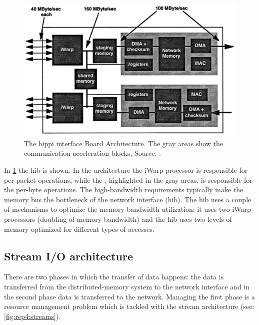 \begin{figure}
    \centering
	\includegraphics[width=0.95\linewidth]{Figures/Rep4hib.png}
	\caption{The \ac{hippi} interface Board Architecture. The gray areas show the communication acceleration blocks, Source: \cite{steenkiste1997high}.}
    \label{fig:rep4:hib}
\end{figure}

In \cref{fig:rep4:hib} the \ac{hib} is shown.
In the architecture the iWarp processor is responsible for per-packet operations, while the , highlighted in the gray areas, is responsible for the per-byte operations.
The high-bandwidth requirements typically make the memory bus the bottleneck of the network interface (\ac{hib}).
The \ac{hib} uses a couple of mechanisms to optimize the memory bandwidth utilization: it uses two iWarp processors (doubling of memory bandwidth) and the \ac{hib} uses two levels of memory optimized for different types of accesses.


\subsection{Stream I/O architecture}
There are two phases in which the transfer of data happens: the data is transferred from the distributed-memory system to the network interface and in the second phase data is transferred to the network.
Managing the first phase is a resource management problem which is tackled with the stream architecture (see: \cref{fig:rep4:streams}).

